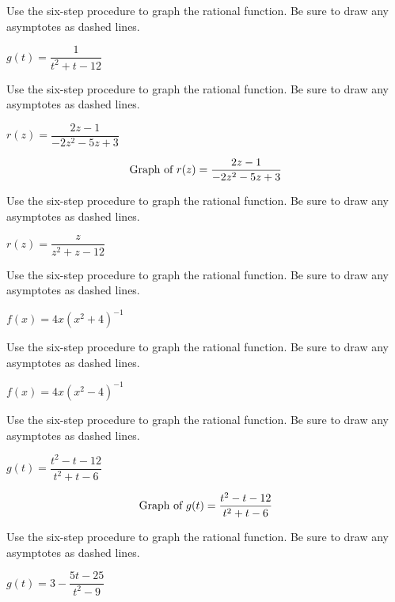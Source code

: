 \documentclass{ximera}
\begin{document}
\begin{problem}
Use the six-step procedure
to graph the rational function.  Be sure to draw any asymptotes as dashed lines.

$g(t) = \dfrac{1}{t^{2} + t - 12}$
\end{problem}

\begin{problem}
Use the six-step procedure
to graph the rational function.  Be sure to draw any asymptotes as dashed lines.

$r(z) = \dfrac{2z - 1}{-2z^{2} - 5z + 3}$

\begin{solution}
\[
\graph[xmin=-7, xmax=5, ymin=-5, ymax=5,panel]{r(z) = \dfrac{2z - 1}{-2z^{2} - 5z + 3}}
\]
\end{solution}
\end{problem} 

\begin{problem}
Use the six-step procedure
to graph the rational function.  Be sure to draw any asymptotes as dashed lines.

$r(z) = \dfrac{z}{z^{2} + z - 12}$
\end{problem}  

\begin{problem}
Use the six-step procedure
to graph the rational function.  Be sure to draw any asymptotes as dashed lines.

$f(x) = 4x(x^2+4)^{-1}$
\end{problem} 

\begin{problem}
Use the six-step procedure
to graph the rational function.  Be sure to draw any asymptotes as dashed lines.

$f(x) = 4x(x^2-4)^{-1}$
\end{problem} 

\begin{problem}
Use the six-step procedure
to graph the rational function.  Be sure to draw any asymptotes as dashed lines.

$g(t) = \dfrac{t^2-t-12}{t^2+t-6}$

\begin{solution}
\[
\graph[xmin=-7, xmax=5, ymin=-5, ymax=5,panel]{g(t) = \dfrac{t^2-t-12}{t^2+t-6}}
\]
\end{solution}
\end{problem} 

\begin{problem}
Use the six-step procedure
to graph the rational function.  Be sure to draw any asymptotes as dashed lines.

$g(t) = 3- \dfrac{5t-25}{t^2-9}$
\end{problem} 
\end{document}
